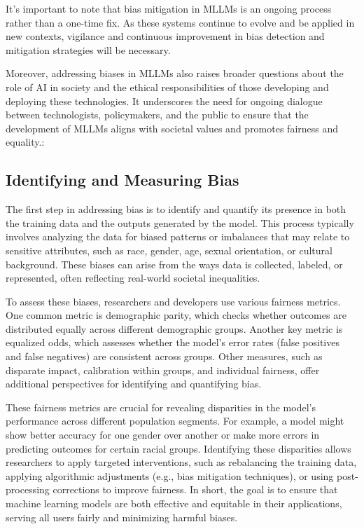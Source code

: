 It's important to note that bias mitigation in MLLMs is an ongoing process rather than a one-time fix. As these systems continue to evolve and be applied in new contexts, vigilance and continuous improvement in bias detection and mitigation strategies will be necessary.

Moreover, addressing biases in MLLMs also raises broader questions about the role of AI in society and the ethical responsibilities of those developing and deploying these technologies. It underscores the need for ongoing dialogue between technologists, policymakers, and the public to ensure that the development of MLLMs aligns with societal values and promotes fairness and equality.:

\subsection{Identifying and Measuring Bias}

The first step in addressing bias is to identify and quantify its presence in both the training data and the outputs generated by the model. This process typically involves analyzing the data for biased patterns or imbalances that may relate to sensitive attributes, such as race, gender, age, sexual orientation, or cultural background. These biases can arise from the ways data is collected, labeled, or represented, often reflecting real-world societal inequalities.

To assess these biases, researchers and developers use various fairness metrics. One common metric is demographic parity, which checks whether outcomes are distributed equally across different demographic groups. Another key metric is equalized odds, which assesses whether the model's error rates (false positives and false negatives) are consistent across groups. Other measures, such as disparate impact, calibration within groups, and individual fairness, offer additional perspectives for identifying and quantifying bias.

These fairness metrics are crucial for revealing disparities in the model’s performance across different population segments. For example, a model might show better accuracy for one gender over another or make more errors in predicting outcomes for certain racial groups. Identifying these disparities allows researchers to apply targeted interventions, such as rebalancing the training data, applying algorithmic adjustments (e.g., bias mitigation techniques), or using post-processing corrections to improve fairness. In short, the goal is to ensure that machine learning models are both effective and equitable in their applications, serving all users fairly and minimizing harmful biases.


